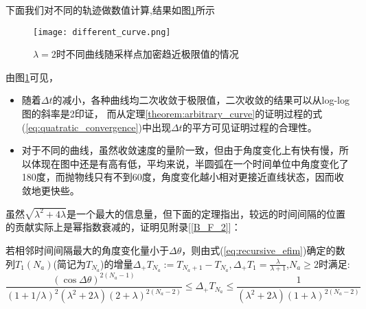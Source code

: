 下面我们对不同的轨迹做数值计算,结果如图\ref{figure:tend_to_limit}所示
\begin{figure}
  \centering
  \texttt{[image: different\_curve.png]}
  \caption{$\lambda=2$时不同曲线随采样点加密趋近极限值的情况}\label{figure:tend_to_limit}
\end{figure}
由图\ref{figure:tend_to_limit}可见，
\begin{itemize}
  \item 随着$\Delta t$的减小，各种曲线均二次收敛于极限值，二次收敛的结果可以从log-log图的斜率是2印证，
而从定理\ref{theorem:arbitrary_curve}的证明过程的式(\ref{eq:quatratic_convergence})中出现$\Delta t$的平方可见证明过程的合理性。
  \item 对于不同的曲线，虽然收敛速度的量阶一致，但由于角度变化上有快有慢，所以体现在图中还是有高有低，平均来说，半圆弧在一个时间单位中角度变化了180度，而抛物线只有不到60度，角度变化越小相对更接近直线状态，因而收敛地更快些。
\end{itemize}
虽然$\sqrt{\lambda^2+4\lambda}$是一个最大的信息量，但下面的定理指出，较远的时间间隔的位置的贡献实际上是幂指数衰减的，证明见附录[\ref{B_F_2}]：
\begin{theorem}\label{theorem:exponential_decreasing}
若相邻时间间隔最大的角度变化量小于$\Delta \theta$，则由式(\ref{eq:recursive_efim})确定的数列$T_1(N_a)$(简记为$T_{N_a}$)的增量$\Delta_{+} T_{N_a}:=T_{N_a+1}-T_{N_a},\Delta_{+} T_{1}=\frac{\lambda}{\lambda+1}$,$N_a\geq 2$时满足:
\[
\frac{(\cos\Delta\theta)^{2(N_a-1)}}{(1+1/\lambda)^2(\lambda^2+2\lambda)(2+\lambda)^{2(N_a-2)}}\leq \Delta_{+} T_{N_a}\leq\frac{1}{(\lambda^2+2\lambda)(1+\lambda)^{2(N_a-2)}}
\]
\end{theorem}

